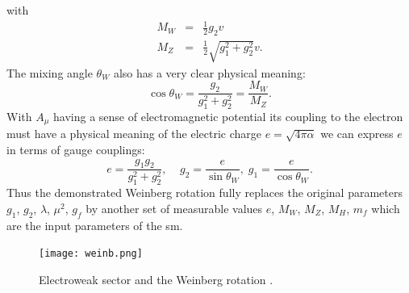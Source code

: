 with
\begin{equation}
\begin{array}{lll} 
M_W &= & \frac{1}{2} g_2 v\\ 
M_Z &=& \frac{1}{2} \sqrt{g_1^2+g_2^2} v.
\end{array} 
\end{equation}
The mixing angle $\theta_W$ also has a very clear physical meaning:
\begin{equation}
\cos{\theta_W}=\frac{g_2}{g_1^2+g_2^2}=\frac{M_W}{M_Z}.
\end{equation}
With $A_{\mu}$ having a sense of electromagnetic potential its coupling to the electron must have a physical meaning of the electric charge $e=\sqrt{4\pi\alpha}$ we can express $e$ in terms of gauge couplings:
\begin{equation}
e=\frac{g_1 g_2}{g_1^2+g_2^2}, \;\;\;\;g_2=\frac{e}{\sin{\theta_W}},\;g_1=\frac{e}{\cos{\theta_W}} .
\end{equation}
Thus the demonstrated Weinberg rotation fully replaces the original parameters $g_1$, $g_2$, $\lambda$, $\mu^2$, $g_f$ by another set of measurable values $e$, $M_W$, $M_Z$, $M_H$, $m_f$ which are the input parameters of the \gls{sm}.


\begin{figure}[htpb]
	\texttt{[image: weinb.png]}
	\caption{Electroweak sector and the Weinberg rotation \cite{coupl_wiki}. }
	\label{fig::weiberg_rotation}
\end{figure}

